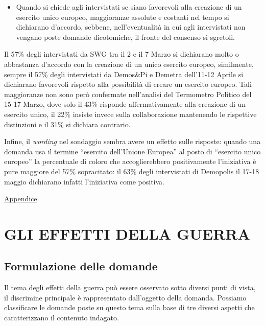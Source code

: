 \documentclass[
]{book}
\providecommand{\tightlist}{%
  \setlength{\itemsep}{0pt}\setlength{\parskip}{0pt}}
\begin{document}
\begin{itemize}
\tightlist
\item
  Quando si chiede agli intervistati se siano favorevoli alla creazione di un esercito unico europeo, maggioranze assolute e costanti nel tempo si dichiarano d'accordo, sebbene, nell'eventualità in cui agli intervistati non vengano poste domande dicotomiche, il fronte del consenso si sgretoli.
\end{itemize}

Il 57\% degli intervistati da SWG tra il 2 e il 7 Marzo si dichiarano molto o abbastanza d'accordo con la creazione di un unico esercito europeo, similmente, sempre il 57\% degli intervistati da Demos\&Pi e Demetra dell'11-12 Aprile si dichiarano favorevoli rispetto alla possibilità di creare un esercito europeo. Tali maggioranze non sono però confermate nell'analisi del Termometro Politico del 15-17 Marzo, dove solo il 43\% risponde affermativamente alla creazione di un esercito unico, il 22\% insiste invece sulla collaborazione mantenendo le rispettive distinzioni e il 31\% si dichiara contrario.

Infine, il \emph{wording} nel sondaggio sembra avere un effetto sulle risposte: quando una domanda usa il termine ``esercito dell'Unione Europea'' al posto di ``esercito unico europeo'' la percentuale di coloro che accoglierebbero positivamente l'iniziativa è pure maggiore del 57\% sopracitato: il 63\% degli intervistati di Demopolis il 17-18 maggio dichiarano infatti l'iniziativa come positiva.

\href{https://github.com/LucianaFazio/Ucrania/blob/main/PDF_Appendice/V.\%20Cosa\%20dobbiamo\%20possiamo\%20fare\%20noi\%20v.5.pdf}{Appendice}

\hypertarget{gli-effetti-della-guerra}{%
\chapter{GLI EFFETTI DELLA GUERRA}\label{gli-effetti-della-guerra}}

\hypertarget{formulazione-delle-domande-4}{%
\section{Formulazione delle domande}\label{formulazione-delle-domande-4}}

Il tema degli effetti della guerra può essere osservato sotto diversi punti di vista, il discrimine principale è rappresentato dall'oggetto della domanda. Possiamo classificare le domande poste su questo tema sulla base di tre diversi aspetti che caratterizzano il contenuto indagato.
\end{document}
